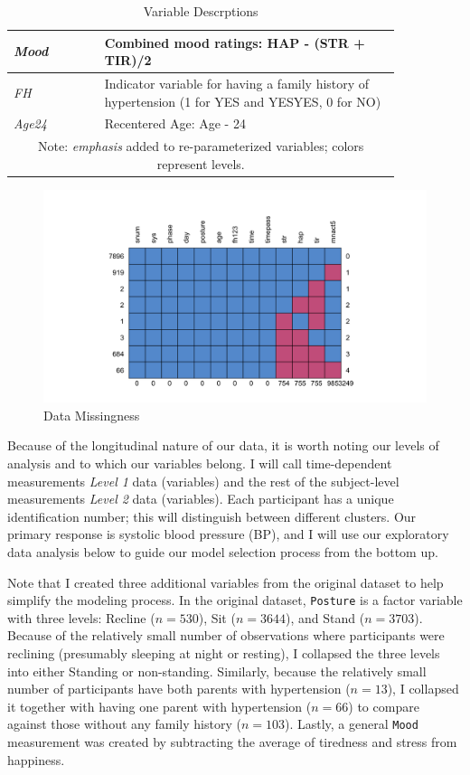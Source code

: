 \documentclass[12pt,twoside,letterpaper]{article}
\theoremstyle{definition}
\theoremstyle{definition}
\begin{document}
\begin{table}
\begin{tabular}{|p{0.2\linewidth} | p{0.65\linewidth}|}
        \emph{\textcolor[RGB]{208, 2, 27}{Mood}} & Combined mood ratings: HAP - (STR + TIR)/2 \\
        \hline
        \emph{\textcolor[RGB]{74, 144, 226}{FH}} & Indicator variable for having a family history of hypertension (1 for YES and YESYES, 0 for NO) \\
        \hline
        \emph{\textcolor[RGB]{74, 144, 226}{Age24}} & Recentered Age: Age - 24 \\
        \hline
        \multicolumn{2}{c}{\footnotesize Note: \emph{emphasis} added to re-parameterized variables; colors represent levels.}
    \end{tabular}
    \caption{Variable Descrptions}
    \label{tab: var desc}
\end{table}

\begin{figure}
\centering
\includegraphics[width=\textwidth]{pics/miss.png}
\caption{Data Missingness}
\label{fig: missing}
\end{figure}

Because of the longitudinal nature of our data, it is worth noting our levels of analysis and to which our variables belong. I will call time-dependent measurements \emph{\textcolor[RGB]{208, 2, 27}{Level 1}} data (variables) and the rest of the subject-level measurements \emph{\textcolor[RGB]{74, 144, 226}{Level 2}} data (variables). Each participant has a unique identification number; this will distinguish between different clusters. Our primary response is systolic blood pressure (BP), and I will use our exploratory data analysis below to guide our model selection process from the bottom up.

Note that I created three additional variables from the original dataset to help simplify the modeling process. In the original dataset, \texttt{Posture} is a factor variable with three levels: Recline ($n = 530$), Sit ($n = 3644$), and Stand ($n = 3703$). Because of the relatively small number of observations where participants were reclining (presumably sleeping at night or resting), I collapsed the three levels into either Standing or non-standing. Similarly, because the relatively small number of participants have both parents with hypertension ($n = 13$), I collapsed it together with having one parent with hypertension ($n = 66$) to compare against those without any family history ($n = 103$). Lastly, a general \texttt{Mood} measurement was created by subtracting the average of tiredness and stress from happiness. 
\end{document}
